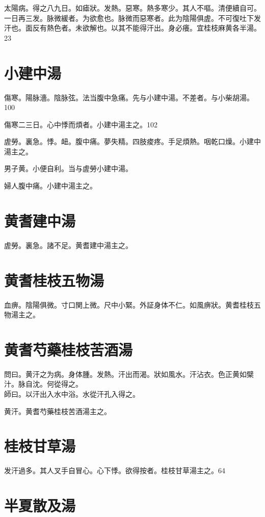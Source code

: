 太陽病。得之八九日。如瘧狀。发熱。惡寒。熱多寒少。其人不嘔。清便續自可。一日再三发。脉微緩者。为欲愈也。脉微而惡寒者。此为陰陽俱虗。不可復{\khaaitp 吐下}发汗也。面反有熱色者。未欲解也。以其不能得汗出。身必癢。宜桂枝麻黄各半湯。23

\section{小建中湯}

傷寒。陽脉濇。陰脉弦。法当腹中急痛。先与小建中湯。不差者。与小柴胡湯。100

傷寒二三日。心中悸而煩者。小建中湯主之。102

虗勞。裏急。悸。衄。腹中痛。夢失精。四肢痠疼。手足煩熱。咽乾口燥。小建中湯主之。

男子黄。小便自利。当与虗勞小建中湯。

婦人腹中痛。小建中湯主之。

\section{黄耆建中湯}

虗勞。裏急。諸不足。黄耆建中湯主之。

\section{黄耆桂枝五物湯}

血痹。陰陽俱微。寸口関上微。尺中小緊。外証身体不仁。如風痹狀。黄耆桂枝五物湯主之。

\section{黄耆芍藥桂枝苦酒湯}

問曰。黄汗之为病。身体腫。发熱。汗出而渴。狀如風水。汗沾衣。色正黄如檗汁。脉自沈。何從得之。\\
師曰。以汗出入水中浴。水從汗孔入得之。

黄汗。黄耆芍藥桂枝苦酒湯主之。

\section{桂枝甘草湯}

发汗過多。其人叉手自冒心。心下悸。欲得按者。桂枝甘草湯主之。64

\section{半夏散及湯}

